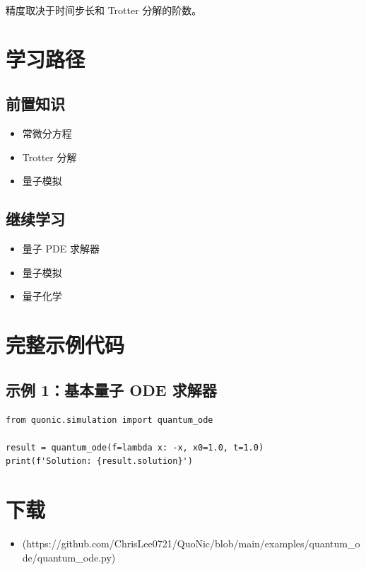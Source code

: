 \documentclass[12pt,a4paper]{article}
\begin{document}
精度取决于时间步长和 Trotter 分解的阶数。

\section{学习路径}

\subsection{前置知识}
\begin{itemize}
  \item 常微分方程
  \item Trotter 分解
  \item 量子模拟
\end{itemize}

\subsection{继续学习}
\begin{itemize}
  \item 量子 PDE 求解器
  \item 量子模拟
  \item 量子化学
\end{itemize}

\section{完整示例代码}

\subsection{示例 1：基本量子 ODE 求解器}

\begin{verbatim}
from quonic.simulation import quantum_ode

result = quantum_ode(f=lambda x: -x, x0=1.0, t=1.0)
print(f'Solution: {result.solution}')
\end{verbatim}

\section{下载}

\begin{itemize}
  \item [quantum\_ode.py](https://github.com/ChrisLee0721/QuoNic/blob/main/examples/quantum_ode/quantum_ode.py)
\end{itemize}
\end{document}
